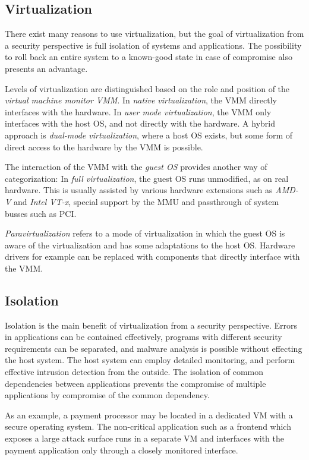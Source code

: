 \subsection{Virtualization}
There exist many reasons to use virtualization, but the goal of virtualization
from a security perspective is full isolation of systems and applications. The
possibility to roll back an entire system to a known-good state in case of
compromise also presents an advantage.

Levels of virtualization are distinguished based on the role and position of the
\emph{virtual machine monitor VMM}. In \emph{native virtualization}, the VMM
directly interfaces with the hardware. In \emph{user mode virtualization}, the
VMM only interfaces with the host OS, and not directly with the hardware. A
hybrid approach is \emph{dual-mode virtualization}, where a host OS exists, but
some form of direct access to the hardware by the VMM is possible.

The interaction of the VMM with the \emph{guest OS} provides another way of
categorization: In \emph{full virtualization}, the guest OS runs unmodified, as
on real hardware. This is usually assisted by various hardware extensions such
as \textit{AMD-V} and \textit{Intel VT-x}, special support by the MMU and
passthrough of system busses such as PCI.

\emph{Paravirtualization} refers to a mode of virtualization in which the guest
OS is aware of the virtualization and has some adaptations to the host OS.
Hardware drivers for example can be replaced with components that directly
interface with the VMM.

\subsection{Isolation}
Isolation is the main benefit of virtualization from a security perspective.
Errors in applications can be contained effectively, programs with different
security requirements can be separated, and malware analysis is possible without
effecting the host system. The host system can employ detailed monitoring, and
perform effective intrusion detection from the outside. The isolation of common
dependencies between applications prevents the compromise of multiple
applications by compromise of the common dependency.

As an example, a payment processor may be located in a dedicated VM with a
secure operating system. The non-critical application such as a frontend which
exposes a large attack surface runs in a separate VM and interfaces with the
payment application only through a closely monitored interface.

